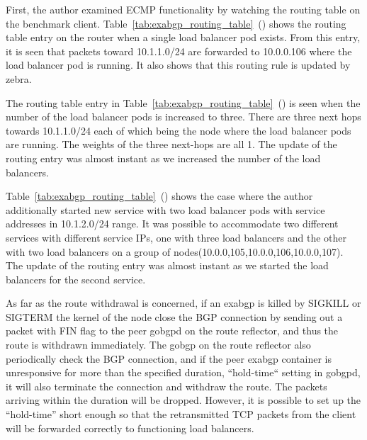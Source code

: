 First, the author examined ECMP functionality by watching the routing table on the benchmark client.
Table~\ref{tab:exabgp_routing_table}~() shows the routing table entry on the router when a single load balancer pod exists.
From this entry, it is seen that packets toward 10.1.1.0/24 are forwarded to 10.0.0.106 where the load balancer pod is running.
It also shows that this routing rule is updated by zebra.

The routing table entry in Table~\ref{tab:exabgp_routing_table}~() is seen when the number of the load balancer pods is increased to three.
There are three next hops towards 10.1.1.0/24 each of which being the node where the load balancer pods are running.
The weights of the three next-hops are all 1.
The update of the routing entry was almost instant as we increased the number of the load balancers.

Table~\ref{tab:exabgp_routing_table}~() shows the case where the author additionally started new service with two load balancer pods with service addresses in 10.1.2.0/24 range.
It was possible to accommodate two different services with different service IPs, one with three load balancers and the other with two load balancers on a group of nodes(10.0.0,105,10.0.0,106,10.0.0,107).
The update of the routing entry was almost instant as we started the load balancers for the second service.

As far as the route withdrawal is concerned, if an exabgp is killed by SIGKILL or SIGTERM the kernel of the node close the BGP connection by sending out a packet with FIN flag to the peer gobgpd on the route reflector, and thus the route is withdrawn immediately.
The gobgp on the route reflector also periodically check the BGP connection, and if the peer exabgp container is unresponsive for more than the specified duration, “hold-time“ setting in gobgpd, it will also terminate the connection and withdraw the route.
The packets arriving within the duration will be dropped.
However, it is possible to set up the “hold-time” short enough so that the retransmitted TCP packets from the client will be forwarded correctly to functioning load balancers.

\FloatBarrier

